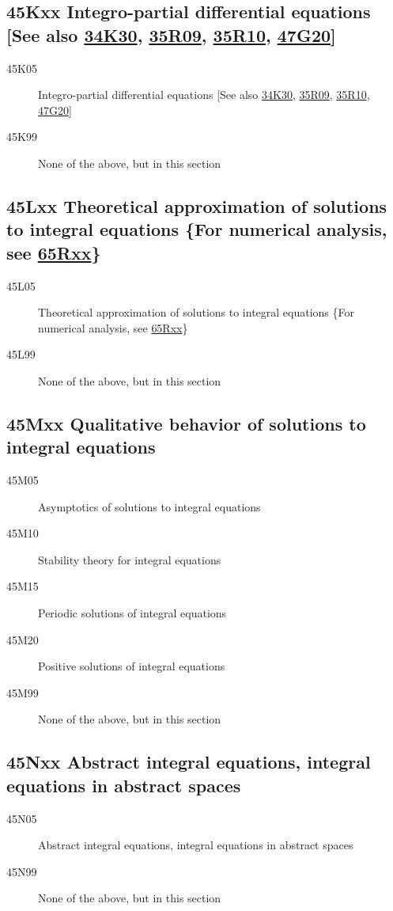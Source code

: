 \subsection*{45Kxx  Integro-partial differential equations [See also \hyperref[34K30]{34K30}, \hyperref[35R09]{35R09}, \hyperref[35R10]{35R10}, \hyperref[47G20]{47G20}] }\label{45Kxx}
\begin{description}  
\item [45K05]\label{45K05} Integro-partial differential equations [See also \hyperref[34K30]{34K30}, \hyperref[35R09]{35R09}, \hyperref[35R10]{35R10}, \hyperref[47G20]{47G20}]
\item [45K99]\label{45K99} None of the above, but in this section
\end{description}
\subsection*{45Lxx  Theoretical approximation of solutions to integral equations \{For numerical analysis, see \hyperref[65Rxx]{65Rxx}\} }\label{45Lxx}
\begin{description}  
\item [45L05]\label{45L05} Theoretical approximation of solutions to integral equations \{For numerical analysis, see \hyperref[65Rxx]{65Rxx}\}
\item [45L99]\label{45L99} None of the above, but in this section
\end{description}
\subsection*{45Mxx  Qualitative behavior of solutions to integral equations}\label{45Mxx}
\begin{description}  
\item [45M05]\label{45M05} Asymptotics of solutions to integral equations
\item [45M10]\label{45M10} Stability theory  for integral equations
\item [45M15]\label{45M15} Periodic solutions of integral equations
\item [45M20]\label{45M20} Positive solutions of integral equations
\item [45M99]\label{45M99} None of the above, but in this section
\end{description}
\subsection*{45Nxx  Abstract integral equations, integral equations in abstract spaces }\label{45Nxx}
\begin{description}  
\item [45N05]\label{45N05} Abstract integral equations, integral equations in abstract spaces
\item [45N99]\label{45N99} None of the above, but in this section
\end{description}
